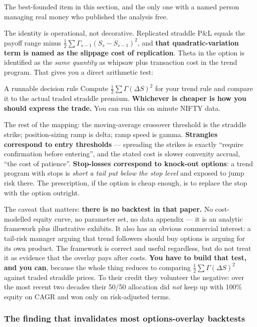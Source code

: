 \documentclass[11pt,a4paper]{article}
\newcommand{\srcnote}[1]{{\footnotesize\color{soft}#1\par}}
\begin{document}
The best-founded item in this section, and the only one with a named person
managing real money who published the analysis free.

The identity is operational, not decorative. Replicated straddle P\&L equals the
payoff range minus $\tfrac{1}{2}\sum \Gamma_{s-1}(S_s - S_{s-1})^2$, and
\textbf{that quadratic-variation term is named as the slippage cost of
replication}. Theta in the option is identified as the \emph{same quantity} as
whipsaw plus transaction cost in the trend program. That gives you a direct
arithmetic test:

\begin{keyfact}{A runnable decision rule}
Compute $\tfrac{1}{2}\sum \Gamma (\Delta S)^2$ for your trend rule and compare it
to the actual traded straddle premium. \textbf{Whichever is cheaper is how you
should express the trade.} You can run this on minute NIFTY data.
\end{keyfact}

The rest of the mapping: the moving-average crossover threshold is the straddle
strike; position-sizing ramp is delta; ramp speed is gamma. \textbf{Strangles
correspond to entry thresholds} --- spreading the strikes is exactly ``require
confirmation before entering'', and the stated cost is slower convexity accrual,
``the cost of patience''. \textbf{Stop-losses correspond to knock-out options}: a
trend program with stops is \emph{short a tail put below the stop level} and
exposed to jump risk there. The prescription, if the option is cheap enough, is to
replace the stop with the option outright.

\srcnote{The caveat that matters: \textbf{there is no backtest in that paper.} No
cost-modelled equity curve, no parameter set, no data appendix --- it is an
analytic framework plus illustrative exhibits. It also has an obvious commercial
interest: a tail-risk manager arguing that trend followers should buy options is
arguing for its own product. The framework is correct and useful regardless, but
do not treat it as evidence that the overlay pays after costs. \textbf{You have to
build that test, and you can}, because the whole thing reduces to comparing
$\tfrac{1}{2}\sum\Gamma(\Delta S)^2$ against traded straddle prices. To their
credit they volunteer the negative: over the most recent two decades their 50/50
allocation did \emph{not} keep up with 100\% equity on CAGR and won only on
risk-adjusted terms.}

\subsubsection{The finding that invalidates most options-overlay backtests}
\end{document}
